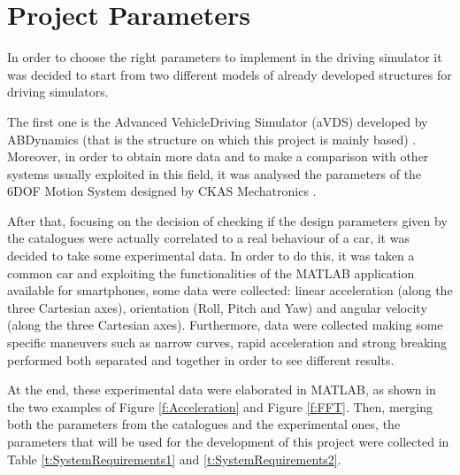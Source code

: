 \documentclass[10.5pt, twocolumn]{article}
\begin{document}
\section{Project Parameters}
In order to choose the right parameters to implement in the driving simulator it was decided to start from two different models of already developed structures for driving simulators.

The first one is the Advanced VehicleDriving Simulator (aVDS) developed by ABDynamics (that is the structure on which this project is mainly based) \cite{aVDS}.
Moreover, in order to obtain more data and to make a comparison with other systems usually exploited in this field, it was analysed the parameters of the 6DOF Motion System designed by CKAS Mechatronics \cite{CKAS}.

After that, focusing on the decision of checking if the design parameters given by the catalogues were actually correlated to a real behaviour of a car, it was decided to take some experimental data.
In order to do this, it was taken a common car and exploiting the functionalities of the MATLAB application available for smartphones, some data were collected: linear acceleration (along the three Cartesian axes), orientation (Roll, Pitch and Yaw) and angular velocity (along the three Cartesian axes).
Furthermore, data were collected making some specific maneuvers such as narrow curves, rapid acceleration and strong breaking performed both separated and together in order to see different results.

At the end, these experimental data were elaborated in MATLAB, as shown in the two examples of Figure \ref{f:Acceleration} and Figure \ref{f:FFT}.
Then, merging both the parameters from the catalogues and the experimental ones, the parameters that will be used for the development of this project were collected in Table \ref{t:SystemRequirements1} and \ref{t:SystemRequirements2}. 
\end{document}
